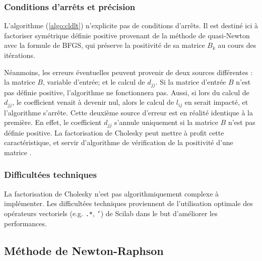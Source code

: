\documentclass[3p, twocolumn]{elsarticle}
\begin{document}
\subsubsection{Conditions d'arrêts et précision}
L'algorithme (\ref{algo:cldlt}) n'explicite pas de conditions d'arrêts. Il est destiné ici à factoriser symétrique définie positive provenant de la méthode de quasi-Newton avec la formule de BFGS, qui préserve la positivité de sa matrice $B_k$ au cours des itérations.

Néanmoins, les erreurs éventuelles peuvent provenir de deux sources différentes : la matrice $B$, variable d'entrée; et le calcul de $d_{jj}$. Si la matrice d'entrée $B$ n'est pas définie positive, l'algorithme ne fonctionnera pas. Aussi, si lors du calcul de $d_{jj}$, le coefficient venait à devenir nul, alors le calcul de $l_{ij}$ en serait impacté, et l'algorithme s'arrête. Cette deuxième source d'erreur est en réalité identique à la première. En effet, le coefficient $d_{jj}$ s'annule uniquement si la matrice $B$ n'est pas définie positive. La factorisation de Cholesky peut mettre à profit cette caractéristique, et servir d'algorithme de vérification de la positivité d'une matrice \cite{art:McSweeney_2017}.

\subsubsection{Difficultées techniques}
La factorisation de Cholesky n'est pas algorithmiquement complexe à implémenter. Les difficultées techniques proviennent de l'utilisation optimale des opérateurs vectoriels (e.g. \texttt{.*}, \texttt{'}) de Scilab dans le but d'améliorer les performances.

\subsection{Méthode de Newton-Raphson}
\end{document}
